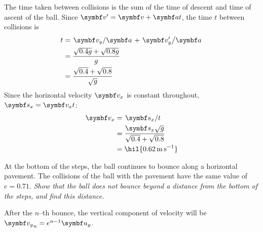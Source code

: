 The time taken between collisions is the sum of the time of descent
and time of ascent
of the ball. Since \(\mv{v}' = \mv{v} + \mv{a}t\), the time \(t\)
between collisions is
\begin{align*}
  t &= \lf{\mv{v}_y}{\mv{a}} + \lf{\mv{v}_y'}{\mv{a}} \\
  &= \f{\sqrt{0.4g} + \sqrt{0.8g}}{g} \\
  &= \f{\sqrt{0.4} + \sqrt{0.8}}{\sqrt{g}}
\end{align*}
Since the horizontal velocity \(\mv{v}_x\) is constant throughout,
\(\mv{s}_x = \mv{v}_xt\):
\begin{align*}
  \mv{v}_x &= \lf{\mv{s}_x}{t} \\
  &= \f{\mv{s}_x\sqrt{g}}{\sqrt{0.4} + \sqrt{0.8}} \\
  &= \hil{\qty{0.62}{\metre\per\second}}
\end{align*}

At the bottom of the steps, the ball continues to bounce along a
horizontal pavement.
The collisions of the ball with the pavement have the same value of
\(e = 0.71\).
\it{Show that the ball does not bounce beyond a distance from the
bottom of the steps, and find this distance.}

After the \(n\)--th bounce, the vertical component of velocity will
be \({\mv{v}_y}_n = e^{n-1}\mv{u}_y\).
